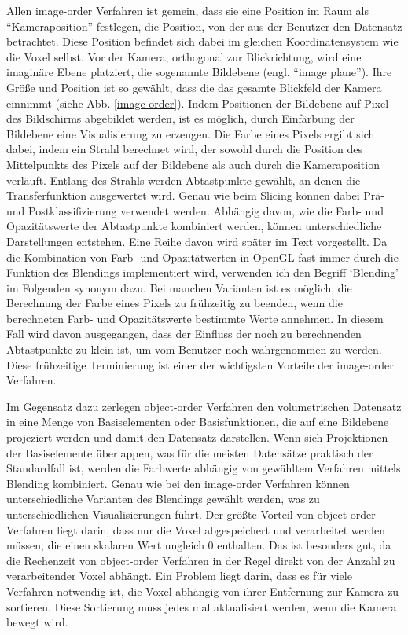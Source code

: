 \documentclass[a4paper,fontsize=12pt,toc=bib,halfparskip]{scrartcl}
\begin{document}
Allen image-order Verfahren ist gemein, dass sie eine Position im Raum als ``Kameraposition'' festlegen, die Position, von der aus der Benutzer den Datensatz betrachtet. Diese Position befindet sich dabei im gleichen Koordinatensystem wie die Voxel selbst. Vor der Kamera, orthogonal zur Blickrichtung, wird eine imagin\"are Ebene platziert, die sogenannte Bildebene (engl. ``image plane''). Ihre Gr\"o{\ss}e und Position ist so gew\"ahlt, dass die das gesamte Blickfeld der Kamera einnimmt (siehe Abb. \ref{image-order}). Indem Positionen der Bildebene auf Pixel des Bildschirms abgebildet werden, ist es m\"oglich, durch Einf\"arbung der Bildebene eine Visualisierung zu erzeugen. Die Farbe eines Pixels ergibt sich dabei, indem ein Strahl berechnet wird, der sowohl durch die Position des Mittelpunkts des Pixels auf der Bildebene als auch durch die Kameraposition verl\"auft. Entlang des Strahls werden Abtastpunkte gew\"ahlt, an denen die Transferfunktion ausgewertet wird. Genau wie beim Slicing k\"onnen dabei Pr\"a- und Postklassifizierung verwendet werden. Abh\"angig davon, wie die Farb- und Opazit\"atswerte der Abtastpunkte kombiniert werden, k\"onnen unterschiedliche Darstellungen entstehen. Eine Reihe davon wird sp\"ater im Text vorgestellt. Da die Kombination von Farb- und Opazit\"atwerten in OpenGL fast immer durch die Funktion des Blendings implementiert wird, verwenden ich den Begriff `Blending' im Folgenden synonym dazu. Bei manchen Varianten ist es m\"oglich, die Berechnung der Farbe eines Pixels zu fr\"uhzeitig zu beenden, wenn die berechneten Farb- und Opazit\"atswerte bestimmte Werte annehmen. In diesem Fall wird davon ausgegangen, dass der Einfluss der noch zu berechnenden Abtastpunkte zu klein ist, um vom Benutzer noch wahrgenommen zu werden. Diese fr\"uhzeitige Terminierung ist einer der wichtigsten Vorteile der image-order Verfahren. 

Im Gegensatz dazu zerlegen object-order Verfahren den volumetrischen Datensatz in eine Menge von Basiselementen oder Basisfunktionen, die auf eine Bildebene projeziert werden und damit den Datensatz darstellen. Wenn sich Projektionen der Basiselemente \"uberlappen, was f\"ur die meisten Datens\"atze praktisch der Standardfall ist, werden die Farbwerte abh\"angig von gew\"ahltem Verfahren mittels Blending kombiniert. Genau wie bei den image-order Verfahren k\"onnen unterschiedliche Varianten des Blendings gew\"ahlt werden, was zu unterschiedlichen Visualisierungen f\"uhrt. Der gr\"o{\ss}te Vorteil von object-order Verfahren liegt darin, dass nur die Voxel abgespeichert und verarbeitet werden m\"ussen, die einen skalaren Wert ungleich 0 enthalten. Das ist besonders gut, da die Rechenzeit von object-order Verfahren in der Regel direkt von der Anzahl zu verarbeitender Voxel abh\"angt. Ein Problem liegt darin, dass es f\"ur viele Verfahren notwendig ist, die Voxel abh\"angig von ihrer Entfernung zur Kamera zu sortieren. Diese Sortierung muss jedes mal aktualisiert werden, wenn die Kamera bewegt wird.
\end{document}
